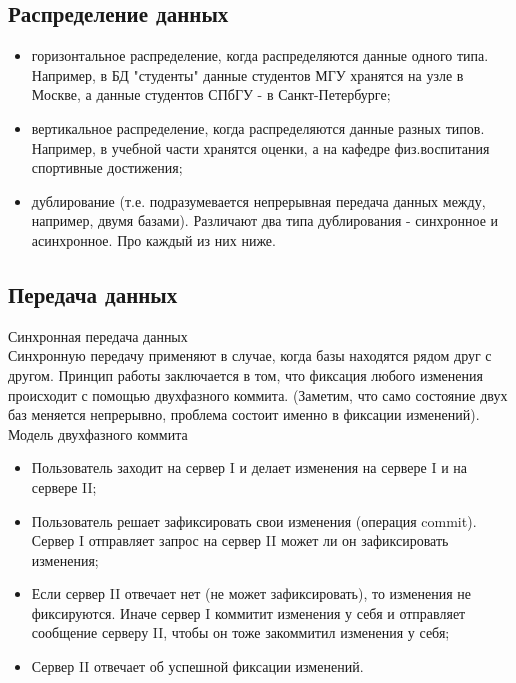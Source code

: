 \subsection {Распределение данных}

\begin{itemize}
\item горизонтальное распределение, когда распределяются данные одного типа. Например, в БД "студенты" данные студентов МГУ хранятся на узле в Москве, а данные студентов СПбГУ - в Санкт-Петербурге; 

\item вертикальное распределение, когда распределяются данные разных типов. Например, в учебной части хранятся оценки, а на кафедре физ.воспитания спортивные достижения;

\item дублирование (т.е. подразумевается непрерывная передача данных между, например, двумя базами). Различают два типа дублирования - синхронное и асинхронное. Про каждый из них ниже.
\end{itemize}

\subsection {Передача данных}
Синхронная передача данных \\
Синхронную передачу применяют в случае, когда базы находятся рядом друг с другом. Принцип работы заключается в том, что фиксация любого изменения происходит с помощью двухфазного коммита. (Заметим, что само состояние двух баз меняется непрерывно, проблема состоит именно в фиксации изменений). \\ 
Модель двухфазного коммита
\begin {itemize}
\item Пользователь заходит на сервер I и делает изменения на сервере I и на сервере II;
\item Пользователь решает зафиксировать свои изменения (операция commit). Сервер I отправляет запрос на сервер II может ли он зафиксировать изменения;
\item Если сервер II отвечает нет (не может зафиксировать), то изменения не фиксируются. Иначе сервер I коммитит изменения у себя и отправляет сообщение серверу II, чтобы он тоже закоммитил изменения у себя; 
\item Сервер II отвечает об успешной фиксации изменений.
\end {itemize}

